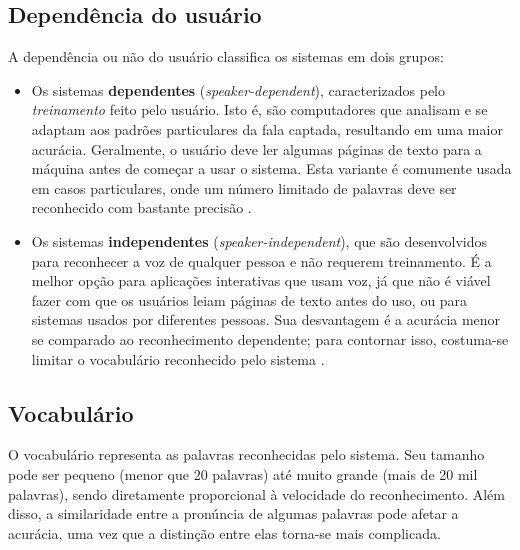
\subsection{Dependência do usuário}

A dependência ou não do usuário classifica os sistemas em dois grupos:

\begin{itemize}
\item Os sistemas \textbf{dependentes} (\textit{speaker-dependent}), caracterizados pelo \emph{treinamento} feito pelo usuário. Isto é, são computadores que analisam e se adaptam aos padrões particulares da fala captada, resultando em uma maior acurácia. Geralmente, o usuário deve ler algumas páginas de texto para a máquina antes de começar a usar o sistema. Esta variante é comumente usada em casos particulares, onde um número limitado de palavras deve ser reconhecido com bastante precisão \citep{speakerDependency}.

\item Os sistemas \textbf{independentes} (\textit{speaker-independent}), que são desenvolvidos para reconhecer a voz de qualquer pessoa e não requerem treinamento. É a melhor opção para aplicações interativas que usam voz, já que não é viável fazer com que os usuários leiam páginas de texto antes do uso, ou para sistemas usados por diferentes pessoas. Sua desvantagem é a acurácia menor se comparado ao reconhecimento dependente; para contornar isso, costuma-se limitar o vocabulário reconhecido pelo sistema \citep{speakerDependency}.
\end{itemize}


\subsection{Vocabulário}

O vocabulário representa as palavras reconhecidas pelo sistema. Seu tamanho pode ser pequeno (menor que 20 palavras) até muito grande (mais de 20 mil palavras), sendo diretamente proporcional à velocidade do reconhecimento. Além disso, a similaridade entre a pronúncia de algumas palavras pode afetar a acurácia, uma vez que a distinção entre elas torna-se mais complicada.


